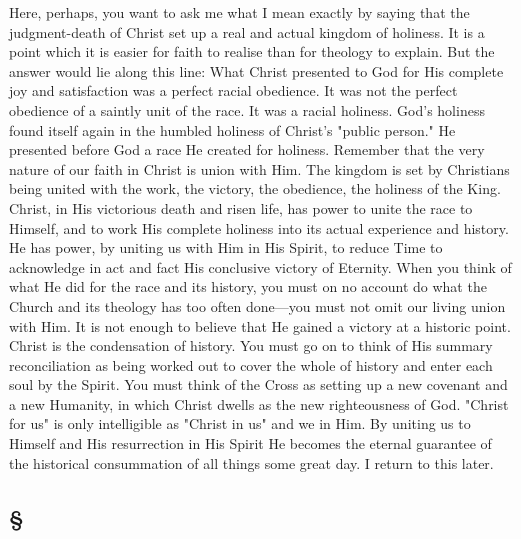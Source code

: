 \documentclass[draft]{ptfdoc}
\begin{document}
Here, perhaps, you want to ask me what I 
mean exactly by saying that the judgment-death 
of Christ set up a real and actual kingdom of 
holiness. It is a point which it is easier for 
faith to realise than for theology to explain. 
But the answer would lie along this line: What 
Christ presented to God for His complete joy 
and satisfaction was a perfect racial obedience. 
It was not the perfect obedience of a saintly 
unit of the race. It was a racial holiness. God's 
holiness found itself again in the humbled holiness 
of Christ's "public person." He presented 
before God a race He created for holiness. Remember 
that the very nature of our faith in 
Christ is union with Him. The kingdom is set 
by Christians being united with the work, the 
victory, the obedience, the holiness of the King. 
Christ, in His victorious death and risen life, 
has power to unite the race to Himself, and 
to work His complete holiness into its actual 
experience and history. He has power, by 
uniting us with Him in His Spirit, to reduce 
Time to acknowledge in act and fact His 
conclusive victory of Eternity. When you 
think of what He did for the race and its 
history, you must on no account do what the 
Church and its theology has too often done---you 
must not omit our living union with Him. 
It is not enough to believe that He gained a 
victory at a historic point. Christ is the 
condensation of history. You must go on to 
think of His summary reconciliation as being 
worked out to cover the whole of history and 
enter each soul by the Spirit. You must think 
of the Cross as setting up a new covenant and 
a new Humanity, in which Christ dwells as the 
new righteousness of God. "Christ for us" is 
only intelligible as "Christ in us" and we in Him. 
By uniting us to Himself and His resurrection 
in His Spirit He becomes the eternal guarantee 
of the historical consummation of all things 
some great day. I return to this later. 

\subsection*{
\S
}
\end{document}
